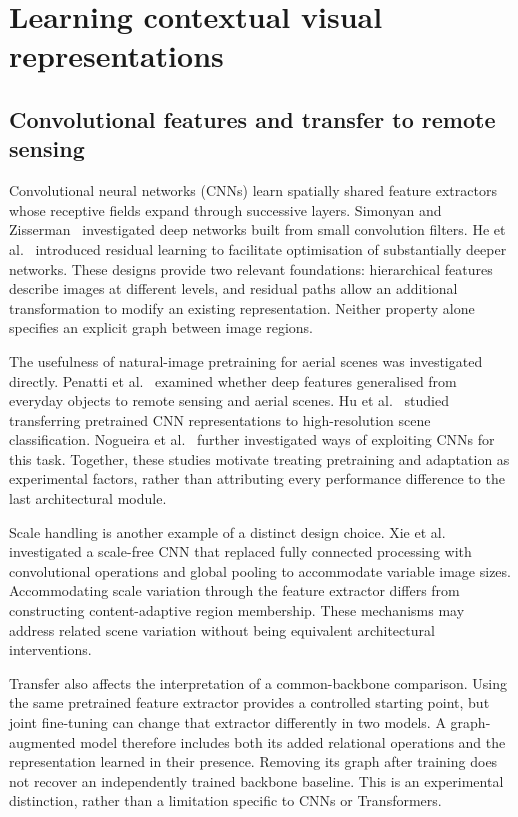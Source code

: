 \section{Learning contextual visual representations}

\subsection{Convolutional features and transfer to remote sensing}

Convolutional neural networks (CNNs) learn spatially shared feature extractors
whose receptive fields expand through successive layers. Simonyan and
Zisserman~\cite{simonyan2015vgg} investigated deep networks built from small
convolution filters. He et al.~\cite{he2016resnet} introduced residual learning
to facilitate optimisation of substantially deeper networks. These designs
provide two relevant foundations: hierarchical features describe images at
different levels, and residual paths allow an additional transformation to
modify an existing representation. Neither property alone specifies an
explicit graph between image regions.

The usefulness of natural-image pretraining for aerial scenes was investigated
directly. Penatti et al.~\cite{penatti2015deepfeatures} examined whether deep
features generalised from everyday objects to remote sensing and aerial
scenes. Hu et al.~\cite{hu2015transferring} studied transferring pretrained
CNN representations to high-resolution scene classification. Nogueira
et al.~\cite{nogueira2017exploiting} further investigated ways of exploiting
CNNs for this task. Together, these studies motivate treating pretraining and
adaptation as experimental factors, rather than attributing every performance
difference to the last architectural module.

Scale handling is another example of a distinct design choice. Xie
et al.~\cite{xie2019scalefree} investigated a scale-free CNN that replaced
fully connected processing with convolutional operations and global pooling
to accommodate variable image sizes. Accommodating scale variation through
the feature extractor differs from constructing content-adaptive region
membership. These mechanisms may address related scene variation without
being equivalent architectural interventions.

Transfer also affects the interpretation of a common-backbone comparison.
Using the same pretrained feature extractor provides a controlled starting
point, but joint fine-tuning can change that extractor differently in two
models. A graph-augmented model therefore includes both its added relational
operations and the representation learned in their presence. Removing its
graph after training does not recover an independently trained backbone
baseline. This is an experimental distinction, rather than a limitation
specific to CNNs or Transformers.

